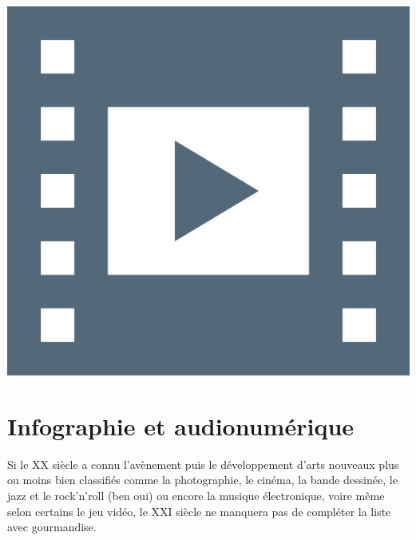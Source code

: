 \begin{marginvideo}[\label{vid:vidV.2}Image et son.]%
	\href{https://www.youtube.com/watch?v=VFQ4SrF91Lc}%
	  {\includegraphics[width=\marginparwidth]{./Images/Pictograms/film-strip-dark-electric-blue.png}}%
\end{marginvideo}

\section[Infographie et audionumérique]{Infographie et audionumérique}
\label{sec:V.2}

Si le XX siècle a connu l'avènement puis le développement d'arts nouveaux plus ou moins bien classifiés comme la photographie, le cinéma, la bande dessinée, le jazz et le rock'n'roll (ben oui) ou encore la musique électronique, voire même selon certains le jeu vidéo, le XXI siècle ne manquera pas de compléter la liste avec gourmandise. 

